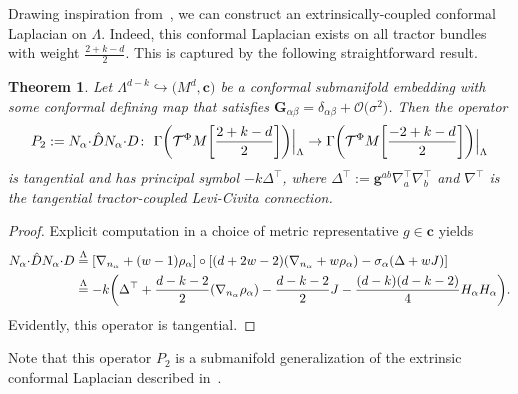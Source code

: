 \documentclass[pdftex]{sigma}
\numberwithin{equation}{section}
\newtheorem{Theorem}{Theorem}[section]
\newcommand{\ct}{\mathcal{T}}
\newcommand{\cc}{\boldsymbol{c}}
\newcommand{\bg}{\boldsymbol{g}}
\newcommand{\bG}{\boldsymbol{G}}
\newcommand{\hd }{\hat{D}}
\renewcommand{\=}{\stackrel \Lambda =}
\newcommand{\csdot}{\hspace{-0.75mm} \cdot \hspace{-0.75mm}}
\begin{document}
Drawing inspiration from~\cite{Will1}, we can construct an extrinsically-coupled conformal Laplacian on $\Lambda$. Indeed, this conformal Laplacian exists on all tractor bundles with weight $\frac{2+k-d}{2}$. This is captured by the following straightforward result.
\begin{Theorem} \label{extr-lap}
Let $\Lambda^{d-k} \hookrightarrow \bigl(M^d,\cc\bigr)$ be a conformal submanifold embedding with some conformal defining map that satisfies $\bG_{\alpha \beta} = \delta_{\alpha \beta} + \mathcal{O}\bigl(\sigma^2\bigr)$. Then the operator
\[P_{2} := N_{\alpha} \csdot \hd N_{\alpha} \csdot D \colon \ \Gamma \biggl(\ct^\Phi M \biggl[\frac{2+k-d}{2} \biggr] \biggr)\Big|_{\Lambda} \rightarrow \Gamma \biggl(\ct^\Phi M \biggl[\frac{-2+k-d}{2} \biggr] \biggr)\Big|_{\Lambda} \]
is tangential and has principal symbol $-k \Delta^\top$, where $\Delta^\top := \bg^{ab} \nabla^\top_a \nabla^\top_b$ and $\nabla^\top$ is the tangential tractor-coupled Levi-Civita connection.
\end{Theorem}
\begin{proof}
Explicit computation in a choice of metric representative $g \in \cc$ yields
\begin{align*}
N_{\alpha} \csdot \hd N_{\alpha} \csdot D &\= [\nabla_{n_{\alpha}} + (w-1)\rho_{\alpha} ] \circ [(d+2w-2) (\nabla_{n_{\alpha}} + w\rho_{\alpha}) - \sigma_{\alpha} (\Delta + w J) ] \\
&\= -k \biggl(\Delta^\top + \frac{d-k-2}{2} (\nabla_{n_\alpha} \rho_{\alpha}) - \frac{d-k-2}{2} J - \frac{(d-k)(d-k-2)}{4} H_{\alpha} H_{\alpha} \biggr) .
\end{align*}
Evidently, this operator is tangential.
\end{proof}

\begin{Remark}
Note that this operator $P_2$ is a submanifold generalization of the extrinsic conformal Laplacian described in~\cite{Will1}.
\end{Remark}
\end{document}
